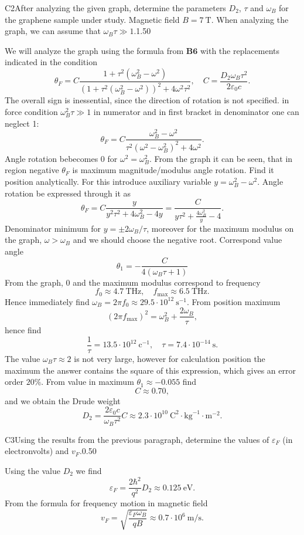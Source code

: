 \documentclass[11pt,a4paper]{article}
\begin{document}
\begin{solcard}{C2}{After analyzing the given graph, determine the parameters $D_2$, $\tau$ and $\omega_B$ for the graphene sample under study. Magnetic field $B = 7~\text{T}$. When analyzing the graph, we can assume that $\omega_B \tau \gg 1$.}{1.50}

We will analyze the graph using the formula from $\mathbf{B6}$ with the replacements indicated in the condition $$ \theta_F =  C\frac{1 +\tau^2( \omega_B^2 - \omega^2) }{(1 +\tau^2( \omega_B^2 - \omega^2))^2 +4 \omega^2\tau^2}, \quad C = \frac{D_2 \omega_B  \tau^2}{2 \varepsilon_0 c}. $$The overall sign is inessential, since the direction of rotation is not specified. in force condition $\omega_B^2 \tau \gg 1$ in numerator and in first bracket in denominator one can neglect 1: $$ \theta_F =  C\frac{ \omega_B^2 - \omega^2}{\tau^2(\omega^2 - \omega_B^2)^2 +4 \omega^2}. $$ Angle rotation bebecomes 0 for $\omega^2 = \omega_B^2$. From the graph it can be seen, that in region negative $\theta_F$ is maximum magnitude/modulus angle rotation. Find it position analytically. For this introduce auxiliary variable $y = \omega_B^2 - \omega^2$. Angle rotation be expressed through it as $$ \theta_F = C \frac{y}{y^2 \tau^2 + 4\omega_B^2 - 4 y} = \frac{C}{y \tau^2 + \frac{4 \omega_B^2}{y}- 4}. $$Denominator minimum for $y = \pm 2 \omega_B/\tau$, moreover for the maximum modulus on the graph, $\omega > \omega_B$ and we should choose the negative root. Correspond value angle $$ \theta_1 =- \frac{C}{ 4 (\omega_B \tau + 1)} $$From the graph, 0 and the maximum modulus correspond to frequency $$ f_0 \approx 4.7 ~\text{THz}, \quad f_{\text{max}} \approx 6.5~\text{THz}. $$Hence immediately find $\omega_B = 2\pi f_0 \approx 29.5 \cdot10^{12} ~\text{s}^{-1}$. From position maximum $$ (2\pi f_{\text{max}})^2 = \omega_B^2 + \frac{2 \omega_B}{\tau}, $$hence find $$ \frac{1}{\tau} = 13.5\cdot 10^{12} ~\text{c}^{-1}, \quad \tau = 7.4 \cdot 10^{-14} ~\text{s}. $$The value $\omega_B \tau \approx 2$ is not very large, however for calculation position the maximum the answer contains the square of this expression, which gives an error order $20\%$. From value in maximum $\theta_1 \approx -0.055$ find $$C \approx 0.70,$$and we obtain the Drude weight $$ D_2 = \frac{2 \varepsilon_0 c}{\omega_B \tau^2} C \approx 2.3\cdot 10^{10} ~\text{C} ^2\cdot \text{kg}^{-1} \cdot \text{m}^{-2}. $$

\end{solcard}

\begin{solcard}{C3}{Using the results from the previous paragraph, determine the values of $\varepsilon_F$ (in electronvolts) and $v_F$.}{0.50}

Using the value $D_2$ we find $$ \varepsilon_F = \frac{2\hbar^2}{q^2} D_2 \approx 0.125 ~\text{eV}. $$From the formula for frequency motion in magnetic field $$ v_F = \sqrt{\frac{\varepsilon_F \omega_B}{q B}} \approx 0.7 \cdot 10^6~\text{m}/\text{s}. $$

\end{solcard}
\end{document}
